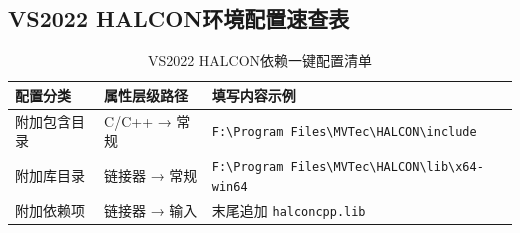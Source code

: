 \documentclass[UTF8,a4paper,12pt]{ctexart}
\begin{document}
\subsection{VS2022 HALCON环境配置速查表}
\begin{table}[H]
\centering
\caption{VS2022 HALCON依赖一键配置清单}
\begin{tabularx}{0.94\textwidth}{|l|l|X|}
\hline
\textbf{配置分类} & \textbf{属性层级路径} & \textbf{填写内容示例} \\
\hline
附加包含目录 & C/C++ → 常规 & \texttt{F:\textbackslash Program Files\textbackslash MVTec\textbackslash HALCON\textbackslash include} \\
附加库目录 & 链接器 → 常规 & \texttt{F:\textbackslash Program Files\textbackslash MVTec\textbackslash HALCON\textbackslash lib\textbackslash x64-win64} \\
附加依赖项 & 链接器 → 输入 & 末尾追加 \texttt{halconcpp.lib} \\
\hline
\end{tabularx}
\end{table}

\newpage
\end{document}
